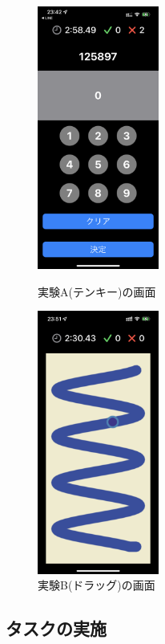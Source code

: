 \begin{figure}[htbp]
  \begin{minipage}{0.5\hsize}
    \begin{center}
       \includegraphics[width=40mm]{img/new1.png}
    \end{center}
    \caption{実験A(テンキー)の画面}
    \label{fig:tenkey}
  \end{minipage}
  \begin{minipage}{0.5\hsize}
    \begin{center}
       \includegraphics[width=40mm]{img/new2.png}
    \end{center}
    \caption{実験B(ドラッグ)の画面}
    \label{fig:drag}
  \end{minipage}
\end{figure}



\subsection{タスクの実施}

